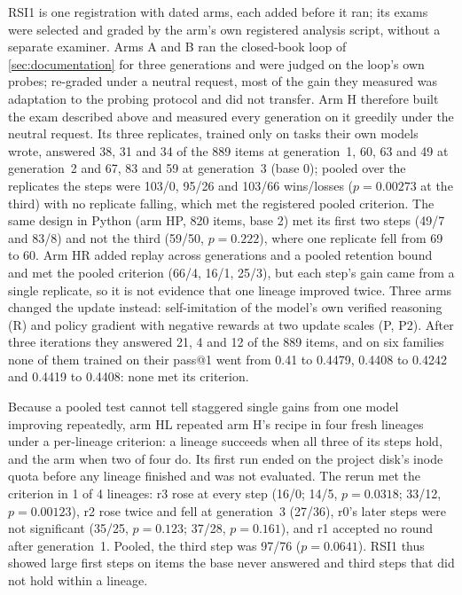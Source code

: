 RSI1 is one registration with dated arms, each added before it ran; its exams were selected and
graded by the arm's own registered analysis script, without a separate examiner. Arms A and B
ran the closed-book loop of \cref{sec:documentation} for three generations and were judged on the
loop's own probes; re-graded under a neutral request, most of the gain they measured was adaptation
to the probing protocol and did not transfer. Arm H therefore built the exam described
above and measured every generation on it greedily under the neutral request. Its three replicates,
trained only on tasks their own models wrote, answered 38, 31 and 34 of the 889 items at
generation~1, 60, 63 and 49 at generation~2 and 67, 83 and 59 at generation~3 (base 0); pooled over the
replicates the steps were 103/0, 95/26 and 103/66 wins/losses ($p=0.00273$ at the third) with no
replicate falling, which met the registered pooled criterion. The same design in Python
(arm HP, 820 items, base 2) met its first two steps (49/7 and 83/8) and not the third (59/50,
$p=0.222$), where one replicate fell from 69 to 60. Arm HR added replay across generations
and a pooled retention bound and met the pooled criterion (66/4, 16/1, 25/3), but each step's gain came
from a single replicate, so it is not evidence that one lineage improved twice. Three arms
changed the update instead: self-imitation of the model's own verified reasoning (R) and policy
gradient with negative rewards at two update scales (P, P2). After three iterations they answered 21,
4 and 12 of the 889 items, and on six families none of them trained on their pass@1 went from 0.41
to 0.4479, 0.4408 to 0.4242 and 0.4419 to 0.4408: none met its criterion.

Because a pooled test cannot tell staggered single gains from one model improving repeatedly, arm HL
repeated arm H's recipe in four fresh lineages under a per-lineage criterion: a lineage succeeds when
all three of its steps hold, and the arm when two of four do. Its first run ended on the project disk's
inode quota before any lineage finished and was not evaluated. The rerun met the criterion in
1 of 4 lineages: r3 rose at every step (16/0; 14/5, $p=0.0318$; 33/12, $p=0.00123$), r2 rose twice and
fell at generation~3 (27/36), r0's later steps were not significant (35/25, $p=0.123$; 37/28,
$p=0.161$), and r1 accepted no round after generation~1. Pooled, the third step was 97/76
($p=0.0641$). RSI1 thus showed large first steps on items the base never answered and
third steps that did not hold within a lineage.

